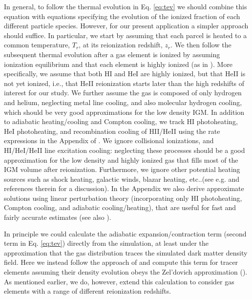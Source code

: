 In general, to follow the thermal evolution in Eq. \ref{eq:tev} we should combine this equation with equations specifying the
evolution of the ionized fraction of each different particle species. However, for our present application a simpler approach should suffice.
In particular, we start by assuming that each parcel is heated to a common temperature, $T_r$, at its reionization redshift, $z_r$. We then 
follow the subsequent
thermal evolution after a gas element is ionized by assuming ionization equilibrium and that each element is highly ionized (as in \citealt{Furlanetto:2009kr}). More specifically,
we assume that both HI and HeI are highly ionized, but that HeII is not yet ionized, i.e., that HeII reionization starts
later than the high redshifts of interest
for our study. We further assume the gas is composed of only hydrogen and helium, neglecting metal line cooling, and also molecular hydrogen cooling,
which should be very good approximations for the low density IGM. In addition to adiabatic heating/cooling and Compton cooling, 
we track HI photoheating, HeI photoheating, and recombination cooling of HII/HeII using the rate expressions in the Appendix
of \citet{Hui:1997dp}. We ignore collisional ionizations, and HI/HeI/HeII line excitation cooling: neglecting these processes should
be a good approximation for the low density and highly ionized gas that fills most of the IGM volume after reionization. Furthermore, we ignore other potential heating sources such as shock heating, galactic winds, blazar heating, etc..(see e.g. \citealt{Hui:2003hn,Chang:2011bf} and references
therein for a discussion). In the Appendix
we also derive approximate solutions using linear perturbation theory (incorporating only HI photoheating, Compton cooling, and
adiabatic cooling/heating), that are useful for fast and fairly accurate estimates (see also \citealt{Hui:1997dp}).

In principle we could calculate the adiabatic expansion/contraction term (second term in Eq. \ref{eq:tev}) directly from the \citet{McQuinn:2007dy} 
simulation, at least
under the approximation that the gas distribution traces the simulated dark matter density field. Here we instead follow the approach of
\citet{Hui:1997dp} and compute this term for tracer elements assuming their density evolution obeys the Zel'dovich approximation (\citealt{1970A&A.....5...84Z}).
As mentioned earlier, we do, however, extend this calculation to consider gas elements with a range of different reionization redshifts. 

